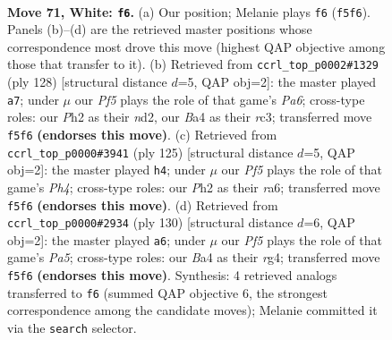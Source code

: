 \documentclass[11pt]{article}
\begin{document}
\clearpage

\begin{figure}[p]\centering
\begin{subfigure}{0.46\textwidth}\centering
\resizebox{\linewidth}{!}{%
\newchessgame
\chessboard[
  setfen={8/5R2/k7/5P2/B7/8/5K1P/8 w - - 3 71},
  showmover=false,
  pgfstyle=straightmove, color=movearrow, markmove={f5-f6}
]}
\caption{}
\end{subfigure}\hfill
\begin{subfigure}{0.46\textwidth}\centering
\resizebox{\linewidth}{!}{%
\newchessgame
\chessboard[
  setfen={6k1/8/P7/8/R7/2r5/3n4/6K1 w - - 0 65},
  showmover=false,
  pgfstyle=straightmove, color=movearrow, markmove={a6-a7}
]}
\caption{}
\end{subfigure}
\\[4pt]
\begin{subfigure}{0.46\textwidth}\centering
\resizebox{\linewidth}{!}{%
\newchessgame
\chessboard[
  setfen={8/4k3/R7/7p/4B3/8/7r/4K3 b - - 0 63},
  showmover=false,
  pgfstyle=straightmove, color=movearrow, markmove={h5-h4}
]}
\caption{}
\end{subfigure}\hfill
\begin{subfigure}{0.46\textwidth}\centering
\resizebox{\linewidth}{!}{%
\newchessgame
\chessboard[
  setfen={8/8/8/P3R3/6r1/1K1k1p2/8/8 w - - 0 66},
  showmover=false,
  pgfstyle=straightmove, color=movearrow, markmove={a5-a6}
]}
\caption{}
\end{subfigure}
\caption{\textbf{Move 71, White: \texttt{f6}.} (a) Our position; Melanie plays \texttt{f6} (\texttt{f5f6}). Panels (b)--(d) are the retrieved master positions whose correspondence most drove this move (highest QAP objective among those that transfer to it). (b) Retrieved from \texttt{ccrl\_top\_p0002\#1329} (ply 128) [structural distance $d$=5, QAP obj=2]: the master played \texttt{a7}; under $\mu$ our \emph{Pf5} plays the role of that game's \emph{Pa6}; cross-type roles: our \emph{P}h2 as their \emph{n}d2, our \emph{B}a4 as their \emph{r}c3; transferred move \texttt{f5f6} \textbf{(endorses this move)}. (c) Retrieved from \texttt{ccrl\_top\_p0000\#3941} (ply 125) [structural distance $d$=5, QAP obj=2]: the master played \texttt{h4}; under $\mu$ our \emph{Pf5} plays the role of that game's \emph{Ph4}; cross-type roles: our \emph{P}h2 as their \emph{r}a6; transferred move \texttt{f5f6} \textbf{(endorses this move)}. (d) Retrieved from \texttt{ccrl\_top\_p0000\#2934} (ply 130) [structural distance $d$=6, QAP obj=2]: the master played \texttt{a6}; under $\mu$ our \emph{Pf5} plays the role of that game's \emph{Pa5}; cross-type roles: our \emph{B}a4 as their \emph{r}g4; transferred move \texttt{f5f6} \textbf{(endorses this move)}. Synthesis: 4 retrieved analogs transferred to \texttt{f6} (summed QAP objective 6, the strongest correspondence among the candidate moves); Melanie committed it via the \texttt{search} selector.}
\label{fig:thought-m140}
\end{figure}
\end{document}
